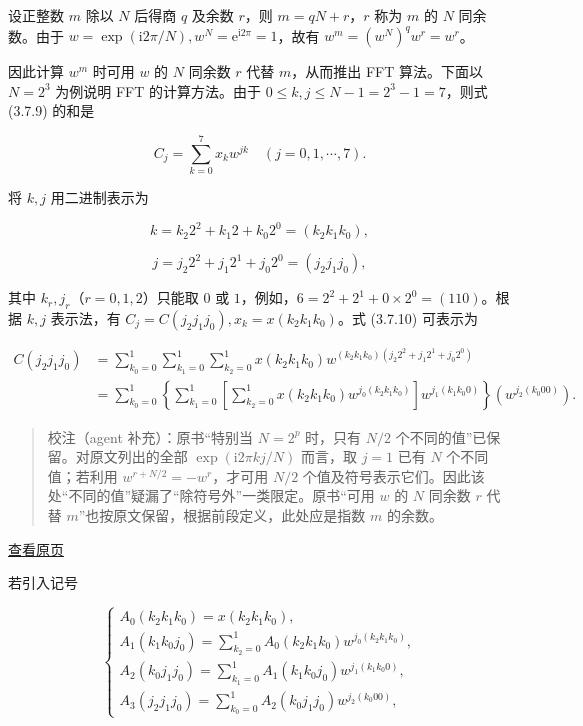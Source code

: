 \documentclass[
  10pt,
  fontset=fandol]{ctexart}
\begin{document}
设正整数 \(m\) 除以 \(N\) 后得商 \(q\) 及余数 \(r\)，则 \(m=qN+r\)，\(r\) 称为 \(m\) 的 \(N\) 同余数。由于 \(w=\exp(\mathrm i2\pi/N),w^N=\mathrm e^{\mathrm i2\pi}=1\)，故有 \(w^m=(w^N)^qw^r=w^r\)。

因此计算 \(w^m\) 时可用 \(w\) 的 \(N\) 同余数 \(r\) 代替 \(m\)，从而推出 FFT 算法。下面以 \(N=2^3\) 为例说明 FFT 的计算方法。由于 \(0\leqslant k,j\leqslant N-1=2^3-1=7\)，则式 (3.7.9) 的和是

\[
C_j=\sum_{k=0}^7x_kw^{jk}\quad(j=0,1,\cdots,7).\tag{3.7.10}
\]

将 \(k,j\) 用二进制表示为

\[
k=k_2 2^2+k_1 2+k_0 2^0=(k_2k_1k_0),
\]

\[
j=j_2 2^2+j_1 2^1+j_0 2^0=(j_2j_1j_0),
\]

其中 \(k_r,j_r\)（\(r=0,1,2\)）只能取 \(0\) 或 \(1\)，例如，\(6=2^2+2^1+0\times2^0=(110)\)。根据 \(k,j\) 表示法，有 \(C_j=C(j_2j_1j_0),x_k=x(k_2k_1k_0)\)。式 (3.7.10) 可表示为

\[
\begin{aligned}
C(j_2j_1j_0)&=\sum_{k_0=0}^1\sum_{k_1=0}^1\sum_{k_2=0}^1x(k_2k_1k_0)w^{(k_2k_1k_0)(j_2 2^2+j_1 2^1+j_0 2^0)}\\
&=\sum_{k_0=0}^1\left\{\sum_{k_1=0}^1\left[\sum_{k_2=0}^1x(k_2k_1k_0)w^{j_0(k_2k_1k_0)}\right]w^{j_1(k_1k_0 0)}\right\}\left(w^{j_2(k_0 00)}\right).
\end{aligned}\tag{3.7.11}
\]

\begin{quote}
校注（agent 补充）：原书``特别当 \(N=2^p\) 时，只有 \(N/2\) 个不同的值''已保留。对原文列出的全部 \(\exp(\mathrm i2\pi kj/N)\) 而言，取 \(j=1\) 已有 \(N\) 个不同值；若利用 \(w^{r+N/2}=-w^r\)，才可用 \(N/2\) 个值及符号表示它们。因此该处``不同的值''疑漏了``除符号外''一类限定。原书``可用 \(w\) 的 \(N\) 同余数 \(r\) 代替 \(m\)''也按原文保留，根据前段定义，此处应是指数 \(m\) 的余数。
\end{quote}

\href{../../source-images/pdf-088.jpeg}{查看原页}

若引入记号

\[
\begin{cases}
A_0(k_2k_1k_0)=x(k_2k_1k_0),\\[4pt]
A_1(k_1k_0j_0)=\displaystyle\sum_{k_2=0}^1A_0(k_2k_1k_0)w^{j_0(k_2k_1k_0)},\\[4pt]
A_2(k_0j_1j_0)=\displaystyle\sum_{k_1=0}^1A_1(k_1k_0j_0)w^{j_1(k_1k_0 0)},\\[4pt]
A_3(j_2j_1j_0)=\displaystyle\sum_{k_0=0}^1A_2(k_0j_1j_0)w^{j_2(k_0 00)},
\end{cases}\tag{3.7.12}
\]
\end{document}
